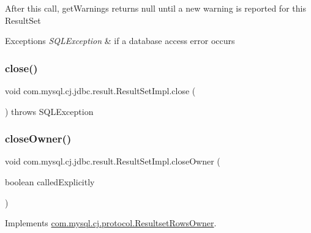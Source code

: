 After this call, get\+Warnings returns null until a new warning is reported for this Result\+Set


\begin{DoxyExceptions}{Exceptions}
{\em S\+Q\+L\+Exception} & if a database access error occurs \\
\hline
\end{DoxyExceptions}
\mbox{\label{classcom_1_1mysql_1_1cj_1_1jdbc_1_1result_1_1_result_set_impl_a09d9ef619232fd78635a6fad7761c0f0}} 
\subsubsection{\texorpdfstring{close()}{close()}}
{\footnotesize\ttfamily void com.\+mysql.\+cj.\+jdbc.\+result.\+Result\+Set\+Impl.\+close (\begin{DoxyParamCaption}{ }\end{DoxyParamCaption}) throws S\+Q\+L\+Exception}

\mbox{\label{classcom_1_1mysql_1_1cj_1_1jdbc_1_1result_1_1_result_set_impl_ad577270f808aab7fefcdeb04f9b9995a}} 
\subsubsection{\texorpdfstring{close\+Owner()}{closeOwner()}}
{\footnotesize\ttfamily void com.\+mysql.\+cj.\+jdbc.\+result.\+Result\+Set\+Impl.\+close\+Owner (\begin{DoxyParamCaption}\item[{boolean}]{called\+Explicitly }\end{DoxyParamCaption})}



Implements \mbox{\hyperlink{interfacecom_1_1mysql_1_1cj_1_1protocol_1_1_resultset_rows_owner_a9ac322b27f59633cab6d7b1148545f73}{com.\+mysql.\+cj.\+protocol.\+Resultset\+Rows\+Owner}}.

